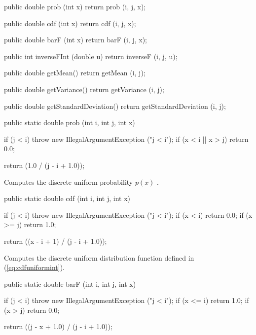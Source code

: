 \begin{code}\begin{hide}

   public double prob (int x) {
      return prob (i, j, x);
   }

   public double cdf (int x) {
      return cdf (i, j, x);
   }

   public double barF (int x) {
      return barF (i, j, x);
   }

   public int inverseFInt (double u) {
      return inverseF (i, j, u);
   }

   public double getMean() {
      return getMean (i, j);
   }

   public double getVariance() {
      return getVariance (i, j);
   }

   public double getStandardDeviation() {
      return getStandardDeviation (i, j);
   }\end{hide}

   public static double prob (int i, int j, int x)\begin{hide} {
      if (j < i)
         throw new IllegalArgumentException ("j < i");
      if (x < i || x > j)
         return 0.0;

      return (1.0 / (j - i + 1.0));
   }\end{hide}
\end{code}
\begin{tabb} Computes the discrete uniform probability $p(x)$%
.
\end{tabb}
\begin{code}

   public static double cdf (int i, int j, int x)\begin{hide} {
      if (j < i)
         throw new IllegalArgumentException ("j < i");
      if (x < i)
         return 0.0;
      if (x >= j)
         return 1.0;

      return ((x - i + 1) / (j - i + 1.0));
   }\end{hide}
\end{code}
 \begin{tabb}
  Computes the discrete uniform distribution function
defined in (\ref{eq:cdfuniformint}).
 \end{tabb}
\begin{code}

   public static double barF (int i, int j, int x)\begin{hide} {
      if (j < i)
        throw new IllegalArgumentException ("j < i");
      if (x <= i)
         return 1.0;
      if (x > j)
         return 0.0;

      return ((j - x + 1.0) / (j - i + 1.0));
   }\end{hide}
\end{code}
